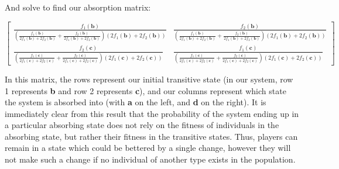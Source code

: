 \documentclass{article}
\begin{document}
And solve to find our absorption matrix:

\begin{equation}
    \begin{bmatrix}
        \frac{f_{1}{\left(\textbf{b} \right)}}{\left(\frac{f_{1}{\left(\textbf{b} \right)}}{2 f_{1}{\left(\textbf{b} \right)} + 2 f_{2}{\left(\textbf{b} \right)}} + \frac{f_{2}{\left(\textbf{b} \right)}}{2 f_{1}{\left(\textbf{b} \right)} + 2 f_{2}{\left(\textbf{b} \right)}}\right) \left(2 f_{1}{\left(\textbf{b} \right)} + 2 f_{2}{\left(\textbf{b} \right)}\right)} & \frac{f_{2}{\left(\textbf{b} \right)}}{\left(\frac{f_{1}{\left(\textbf{b} \right)}}{2 f_{1}{\left(\textbf{b} \right)} + 2 f_{2}{\left(\textbf{b} \right)}} + \frac{f_{2}{\left(\textbf{b} \right)}}{2 f_{1}{\left(\textbf{b} \right)} + 2 f_{2}{\left(\textbf{b} \right)}}\right) \left(2 f_{1}{\left(\textbf{b} \right)} + 2 f_{2}{\left(\textbf{b} \right)}\right)}\\\frac{f_{2}{\left(\textbf{c} \right)}}{\left(\frac{f_{1}{\left(\textbf{c} \right)}}{2 f_{1}{\left(\textbf{c} \right)} + 2 f_{2}{\left(\textbf{c} \right)}} + \frac{f_{2}{\left(\textbf{c} \right)}}{2 f_{1}{\left(\textbf{c} \right)} + 2 f_{2}{\left(\textbf{c} \right)}}\right) \left(2 f_{1}{\left(\textbf{c} \right)} + 2 f_{2}{\left(\textbf{c} \right)}\right)} & \frac{f_{1}{\left(\textbf{c} \right)}}{\left(\frac{f_{1}{\left(\textbf{c} \right)}}{2 f_{1}{\left(\textbf{c} \right)} + 2 f_{2}{\left(\textbf{c} \right)}} + \frac{f_{2}{\left(\textbf{c} \right)}}{2 f_{1}{\left(\textbf{c} \right)} + 2 f_{2}{\left(\textbf{c} \right)}}\right) \left(2 f_{1}{\left(\textbf{c} \right)} + 2 f_{2}{\left(\textbf{c} \right)}\right)}
    \end{bmatrix}
    \label{eqn:2x2_Moran_Absorption}
\end{equation}

In this matrix, the rows represent our initial transitive state (in our system,
row 1 represents \textbf{b} and row 2 represents \textbf{c}), and our columns
represent which state the system is absorbed into (with \textbf{a} on the left,
and \textbf{d} on the right). It is immediately clear from this result that the
probability of the system ending up in a particular absorbing state does not
rely on the fitness of individuals in the absorbing state, but rather their
fitness in the transitive states. Thus, players can remain in a state which
could be bettered by a single change, however they will not make such a change
if no individual of another type exists in the population.
\end{document}
